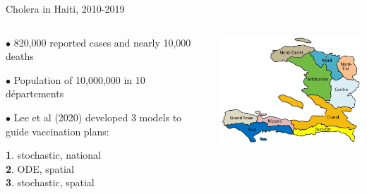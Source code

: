 \documentclass{beamer}
\begin{document}
\begin{frame}{Cholera in Haiti, 2010-2019}


  
\begin{columns}[T] %

\begin{column}{.35\textwidth}
  \vspace{5mm}
  
$\bullet$  820,000 reported cases and nearly 10,000 deaths

    \vspace{5mm}

$\bullet$  Population of 10,000,000 in 10 d\'{e}partements

    \vspace{5mm}
    
    $\bullet$  Lee et al (2020) developed 3 models to guide vaccination plans:

    \vspace{1mm}
    
    {\bf 1}. stochastic, national \\
    {\bf 2}. ODE, spatial \\
    {\bf 3}. stochastic, spatial

\end{column}

\begin{column}{.62\textwidth}
  \includegraphics[width=7.5cm]{haiti/haiti.png}


\end{column}
\end{columns}
\end{frame}
\end{document}
